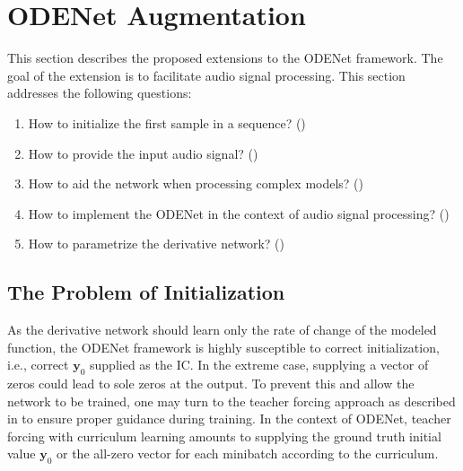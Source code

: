 \section{ODENet Augmentation}

This section describes the proposed extensions to the ODENet framework. The goal of the extension is to facilitate audio signal processing. This section addresses the following questions:
\begin{enumerate}
  \item How to initialize the first sample in a sequence? ()
  \item How to provide the input audio signal? ()
  \item How to aid the network when processing complex models? ()
  \item How to implement the ODENet in the context of audio signal processing? ()
  \item How to parametrize the derivative network? ()
\end{enumerate}

\subsection{The Problem of Initialization}
\label{subsec:initialization}

As the derivative network should learn only the rate of change of the modeled function, the ODENet framework is highly susceptible to correct initialization, i.e., correct $\pmb{y}_0$ supplied as the \acf{IC}. In the extreme case, supplying a vector of zeros could lead to sole zeros at the output. To prevent this and allow the network to be trained, one may turn to the teacher forcing approach
as described in 
to ensure proper guidance during training. In the context of ODENet, teacher forcing with curriculum learning amounts to supplying the ground truth initial value $\pmb{y}_0$ or the all-zero vector for each minibatch according to the curriculum.

